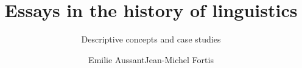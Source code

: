 \renewcommand{\lsSeries}{hpls}
\renewcommand{\lsSeriesNumber}{3}

\title{Essays in the history of linguistics}
\subtitle{Descriptive concepts and case studies}
\author{Emilie Aussant\lastand Jean-Michel Fortis}
